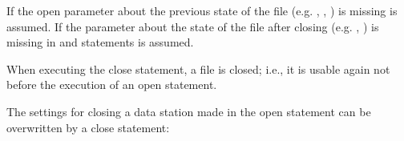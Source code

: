 
If the open parameter about the previous state of the file (e.g. , , )
is missing  is assumed.
If the parameter about the state of the file after closing (e.g. , )
is missing in  and  statements  is assumed.

When executing the close statement, a file is closed; i.e., it is
usable again not before the execution of an open statement.

\begin{grammarframe}

\end{grammarframe}

The settings for closing a data station made in the open statement can
be overwritten by a close statement:

\begin{grammarframe}

\end{grammarframe}

